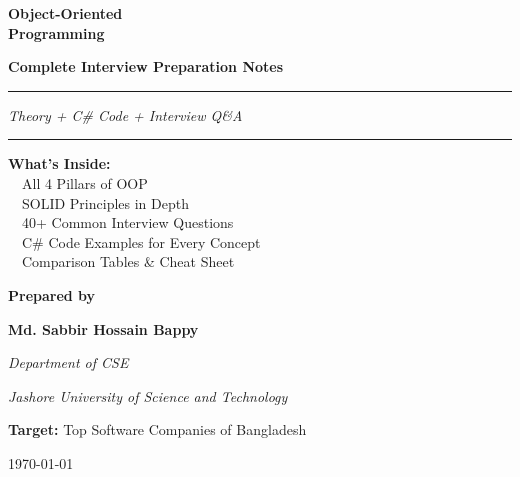 \documentclass[11pt,a4paper]{article}
\begin{document}
\begin{titlepage}
\centering
\vspace*{1.5cm}

{\Huge\bfseries\color{defnBlue} Object-Oriented \\[0.3cm] Programming \par}
\vspace{0.7cm}
{\LARGE\bfseries\color{headerDark} Complete Interview Preparation Notes \par}

\vspace{1.5cm}
{\color{defnBlue}\rule{0.75\textwidth}{1.2pt}}\par
\vspace{0.5cm}
{\Large \textit{Theory + C\# Code + Interview Q\&A} \par}
\vspace{0.4cm}
{\color{defnBlue}\rule{0.75\textwidth}{1.2pt}}\par

\vspace{2.5cm}

\begin{tcolorbox}[colback=defnBg,colframe=defnBlue,arc=3mm,width=0.7\textwidth]
\centering
\textbf{\large What's Inside:}\\[6pt]
\faCheckCircle~~All 4 Pillars of OOP\\
\faCheckCircle~~SOLID Principles in Depth\\
\faCheckCircle~~40+ Common Interview Questions\\
\faCheckCircle~~C\# Code Examples for Every Concept\\
\faCheckCircle~~Comparison Tables \& Cheat Sheet
\end{tcolorbox}

\vfill
\begin{tcolorbox}[colback=defnBg,colframe=defnBlue,arc=2mm,width=0.7\textwidth,boxrule=1pt]
\centering
{\large \textbf{Prepared by} \par}
\vspace{0.25cm}
{\LARGE\bfseries\color{defnBlue} Md. Sabbir Hossain Bappy \par}
\vspace{0.15cm}
{\normalsize \textit{Department of CSE} \par}
{\normalsize \textit{Jashore University of Science and Technology} \par}
\end{tcolorbox}
\vspace{0.7cm}
{\large \textbf{Target:} Top Software Companies of Bangladesh \par}
\vspace{0.3cm}
{\large \today \par}
\end{titlepage}
\end{document}
